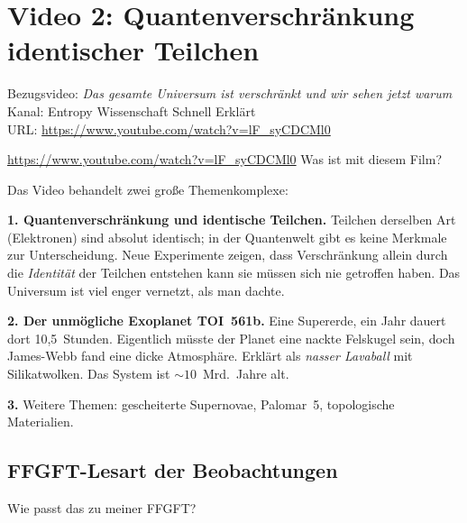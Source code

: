 \section{Video 2: Quantenverschr\"ankung identischer Teilchen}

\begin{videobox}
Bezugsvideo: \emph{Das gesamte Universum ist verschr\"ankt \textendash{} und wir sehen jetzt warum} \\
Kanal: Entropy \textendash{} Wissenschaft Schnell Erkl\"art \\
URL: \url{https://www.youtube.com/watch?v=lF_syCDCMl0}
\end{videobox}

\begin{userbox}
\url{https://www.youtube.com/watch?v=lF_syCDCMl0} \quad Was ist mit diesem Film?
\end{userbox}

\begin{geminibox}
Das Video behandelt zwei gro{\ss}e Themenkomplexe:

\textbf{1. Quantenverschr\"ankung und identische Teilchen.} Teilchen derselben Art (Elektronen) sind absolut identisch; in der Quantenwelt gibt es keine Merkmale zur Unterscheidung. Neue Experimente zeigen, dass Verschr\"ankung allein durch die \emph{Identit\"at} der Teilchen entstehen kann \textendash{} sie m\"ussen sich nie getroffen haben. Das Universum ist viel enger vernetzt, als man dachte.

\textbf{2. Der \glqq unm\"ogliche\grqq{} Exoplanet TOI~561b.} Eine Supererde, ein Jahr dauert dort 10{,}5~Stunden. Eigentlich m\"usste der Planet eine nackte Felskugel sein, doch James-Webb fand eine dicke Atmosph\"are. Erkl\"art als \emph{nasser Lavaball} mit Silikatwolken. Das System ist $\sim 10$~Mrd.~Jahre alt.

\textbf{3.} Weitere Themen: gescheiterte Supernovae, Palomar~5, topologische Materialien.
\end{geminibox}

\subsection{FFGFT-Lesart der Beobachtungen}

\begin{userbox}
Wie passt das zu meiner FFGFT?
\end{userbox}

